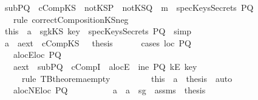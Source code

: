 \begin{isabellebody}
\ \ \ \ \ \isamarkupfalse \ subPQ\ \ cCompKS\ \ notKSP\ \ notKSQ\ \isamarkupfalse \ {\isachardoublequoteopen}m\ {\isasymnotin}\ specKeysSecrets\ PQ{\isachardoublequoteclose}\ \isanewline
\ \ \ \ \ \ \ \isamarkupfalse \ {\isacharparenleft}rule\ correctCompositionKS{\isacharunderscore}neg{}{\isacharparenright}\ \isanewline
\ \ \ \ \ \isamarkupfalse \ this\ \ a{}\ \isamarkupfalse \ sg{}{\isacharcolon}{\isachardoublequoteopen}kKS\ key\ {\isasymnotin}\ specKeysSecrets\ PQ{\isachardoublequoteclose}\ \isamarkupfalse \ simp\isanewline
\ \ \ \ \ \isamarkupfalse \ a{}\ \ a{}{}ext\ \ cCompKS\ \ \isamarkupfalse \ {\isacharquery}thesis\isanewline
\ \ \ \ \ \isamarkupfalse \ {\isacharparenleft}cases\ {\isachardoublequoteopen}loc\ PQ\ {\isacharequal}\ {\isacharbraceleft}{\isacharbraceright}{\isachardoublequoteclose}{\isacharparenright}\isanewline
\ \ \ \ \ \ \ \isamarkupfalse \ a{}{}locE{\isacharcolon}{\isachardoublequoteopen}loc\ PQ\ {\isacharequal}\ {\isacharbraceleft}{\isacharbraceright}{\isachardoublequoteclose}\isanewline
\ \ \ \ \ \ \ \isamarkupfalse \ a{}{}ext\ \ subPQ\ \ cCompI\ \ a{}{}locE\ \isamarkupfalse \ {\isachardoublequoteopen}ine\ PQ\ {\isacharparenleft}kE\ key{\isacharparenright}{\isachardoublequoteclose}\ \isanewline
\ \ \ \ \ \ \ \ \ \isamarkupfalse \ {\isacharparenleft}rule\ TBtheorem{}a{\isacharunderscore}empty{\isacharparenright}\ \isanewline
\ \ \ \ \ \ \ \isamarkupfalse \ this\ \ a{}\ \isamarkupfalse \ {\isacharquery}thesis\ \isamarkupfalse \ auto\isanewline
\ \ \ \ \ \isamarkupfalse \ \isanewline
\ \ \ \ \ \ \ \isamarkupfalse \ a{}{}locNE{\isacharcolon}{\isachardoublequoteopen}loc\ PQ\ {\isasymnoteq}\ {\isacharbraceleft}{\isacharbraceright}{\isachardoublequoteclose}\isanewline
\ \ \ \ \ \ \ \isamarkupfalse \ a{}\ \ a{}{}\ \ sg{}\ \ assms\ \isamarkupfalse \ {\isacharquery}thesis\isanewline

\end{isabellebody}
